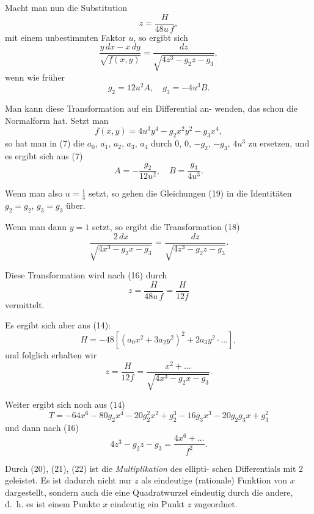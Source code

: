 \documentclass[12pt,a4paper]{book}
\theoremstyle{definition}
\begin{document}
Macht man nun die Substitution
\begin{equation}
z = \frac{H}{48u\,f}, \tag{17}
\end{equation}
mit einem unbestimmten Faktor $u$, so ergibt sich
\begin{equation}
\frac{y\,dx - x\,dy}{\sqrt{f(x,y)}} = \frac{dz}{\sqrt{4z^3 - g_2 z - g_3}}, \tag{18}
\end{equation}
wenn wie fr\"uher
\begin{equation}
g_2 = 12u^2 A, \quad g_3 = -4u^3 B. \tag{19}
\end{equation}

Man kann diese Transformation auf ein Differential an-
wenden, das schon die Normalform hat. Setzt man
\[
f(x,y) = 4u^3 y^4 - g_2 x^2 y^2 - g_3 x^4,
\]
so hat man in (7) die $a_0$, $a_1$, $a_2$, $a_3$, $a_4$ durch $0$, $0$, $-g_2$, $-g_3$, $4u^3$
zu ersetzen, und es ergibt sich aus (7)
\[
A = -\frac{g_2}{12u^2}, \quad B = \frac{g_3}{4u^3}.
\]

Wenn man also $u = \tfrac{1}{4}$ setzt, so gehen die Gleichungen (19)
in die Identit\"aten $g_2 = g_2$, $g_3 = g_3$ \"uber.

Wenn man dann $y = 1$ setzt, so ergibt die Transformation (18)
\begin{equation}
\frac{2\,dx}{\sqrt{4x^3 - g_2 x - g_3}} = \frac{dz}{\sqrt{4z^3 - g_2 z - g_3}}. \tag{20}
\end{equation}

Diese Transformation wird nach (16) durch
\[
z = \frac{H}{48u\,f} = \frac{H}{12f}
\]
vermittelt.

Es ergibt sich aber aus (14):
\[
H = -48[(a_0 x^2 + 3a_2 y^2)^2 + 2a_3 y^2 \cdot \dots],
\]
und folglich erhalten wir
\begin{equation}
z = \frac{H}{12f} = \frac{x^2 + \dots}{\sqrt{4x^3 - g_2 x - g_3}}. \tag{21}
\end{equation}

Weiter ergibt sich noch aus (14)
\[
T = -64x^6 - 80g_2 x^4 - 20g_2^2 x^2 + g_2^3 - 16g_3 x^3 - 20g_2 g_3 x + g_3^2
\]
und dann nach (16)
\begin{equation}
4z^3 - g_2 z - g_3 = \frac{4x^6 + \dots}{f^2}. \tag{22}
\end{equation}

Durch (20), (21), (22) ist die \emph{Multiplikation} des ellipti-
schen Differentials mit 2 geleistet. Es ist dadurch nicht nur
$z$ als eindeutige (rationale) Funktion von $x$ dargestellt, sondern
auch die eine Quadratwurzel eindeutig durch die andere, d.~h. es
ist einem Punkte $x$ eindeutig ein Punkt $z$ zugeordnet.
\end{document}
